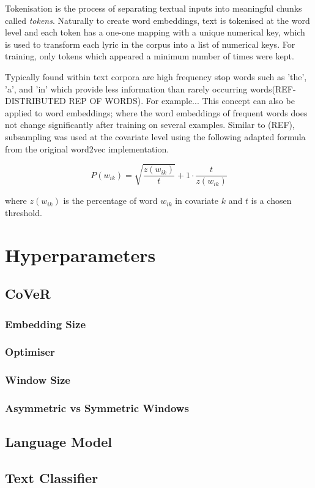 \noindent
\newline
Tokenisation is the process of separating textual inputs into meaningful chunks called \textit{tokens}. Naturally to create word embeddings, text is tokenised at the word level and each token has a one-one mapping with a unique numerical key, which is used to transform each lyric in the corpus into a list of numerical keys. For training, only tokens which appeared a minimum number of times were kept.
 
\noindent
\newline
Typically found within text corpora are high frequency stop words such as 'the', 'a', and 'in' which provide less information than rarely occurring words(REF-DISTRIBUTED REP OF WORDS). For example... This concept can also be applied to word embeddings; where the word embeddings of frequent words does not change significantly after training on several examples. Similar to (REF), subsampling was used at the covariate level using the following adapted formula from the original word2vec implementation.

\begin{equation}
P(w_{ik}) = \sqrt{\dfrac{z(w_{ik})}{t}} + 1 \cdot \dfrac{t}{z(w_{ik})}
\end{equation}

\noindent
\newline
where \(z(w_{ik})\) is the percentage of word \(w_{ik}\) in covariate \(k\) and \(t\) is a chosen threshold.

\section{Hyperparameters}
\subsection{CoVeR}
\subsubsection{Embedding Size}
\subsubsection{Optimiser}
\subsubsection{Window Size}
\subsubsection{Asymmetric vs Symmetric Windows}
\subsection{Language Model}
\subsection{Text Classifier}

